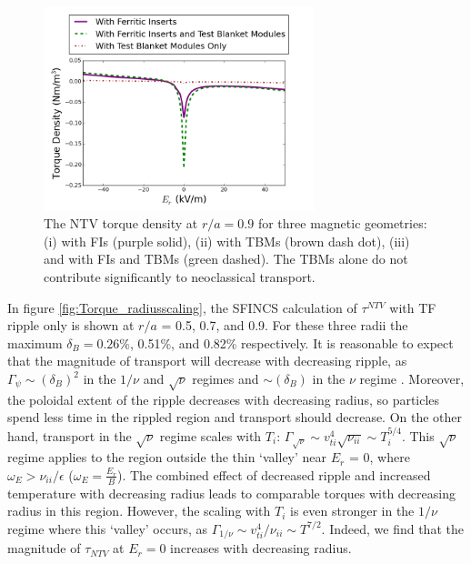 \documentclass{article}
\begin{document}
\begin{figure}[h!]
\centering
\includegraphics[width=0.7\textwidth]{Torque_comparingTBMandFI.png}
\caption{\label{fig:Torque_comparingTBMandFI} The NTV torque density at $r/a = 0.9$ for three magnetic geometries: (i) with FIs (purple solid), (ii) with TBMs (brown dash dot), (iii) and with FIs and TBMs (green dashed). The TBMs alone do not contribute significantly to neoclassical transport. }
\end{figure}

In figure \ref{fig:Torque_radiusscaling}, the SFINCS calculation of $\tau^{NTV}$ with TF ripple only is shown at $r/a$ = 0.5, 0.7, and 0.9. For these three radii the maximum $\delta_B = 0.26\%$, 0.51\%, and 0.82\% respectively. It is reasonable to expect that the magnitude of transport will decrease with decreasing ripple, as $\Gamma_{\psi} \sim (\delta_B)^2$ in the $1/\nu$ and $\sqrt{\nu}$ regimes and $\sim (\delta_B)$ in the $\nu$ regime \cite{Shaing2010}.  Moreover, the poloidal extent of the ripple decreases with decreasing radius, so particles spend less time in the rippled region and transport should decrease. On the other hand, transport in the $\sqrt{\nu}$ regime scales with $T_i$: $\Gamma_{\sqrt{\nu}} \sim v_{ti}^4 \sqrt{\nu_{ii}} \sim T_i^{5/4}$. This $\sqrt{\nu}$ regime applies to the region outside the thin `valley' near $E_r$ = 0, where $\omega_E > \nu_{ii}/\epsilon$ ($\omega_E = \frac{E_r}{B}$). The combined effect of decreased ripple and increased temperature with decreasing radius leads to comparable torques with decreasing radius in this region. However, the scaling with $T_i$ is even stronger in the $1/\nu$ regime where this `valley' occurs, as $\Gamma_{1/\nu} \sim v_{ti}^4/\nu_{ii} \sim T^{7/2}$. Indeed, we find that the magnitude of $\tau_{NTV}$ at $E_r = 0$ increases with decreasing radius. 
\end{document}
